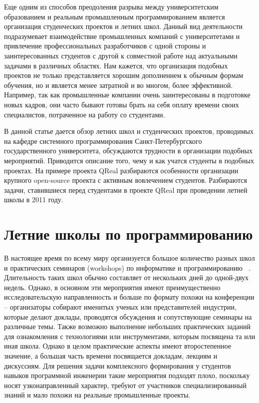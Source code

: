\documentclass[a4paper]{article}
\begin{document}
Еще одним из способов преодоления разрыва между университетским образованием и реальным промышленным программированием является организация студенческих проектов и летних школ. Данный вид деятельности подразумевает взаимодействие промышленных компаний с университетами и привлечение профессиональных разработчиков с одной стороны и заинтересованных студентов с другой к совместной работе над актуальными задачами в различных областях. Нам кажется, что организация подобных проектов не только представляется хорошим дополнением к обычным формам обучения, но и является менее затратной и во многом, более эффективной. Например, так как промышленные компании очень заинтересованы в подготовке новых кадров, они часто бывают готовы брать на себя оплату времени своих специалистов, потраченное на работу со студентами. 
 
В данной статье дается обзор летних школ и студенческих проектов, проводимых на кафедре системного программирования Санкт-Петербургского государственного университета, обсуждаются трудности в организации подобных мероприятий. Приводится описание того, чему и как учатся студенты в подобных проектах. На примере проекта QReal разбираются особенности организации крупного open-source проекта с активным вовлечением студентов. Разбираются задачи, ставившиеся перед студентами в проекте QReal при проведении летней школы в 2011 году.

\section{Летние школы по программированию}

В настоящее время по всему миру организуется большое количество разных школ и практических семинаров (workshops) по информатике и программированию ~\cite{schoolList}. Длительность таких школ обычно составляет от нескольких дней до одной-двух недель. Однако, в основном эти мероприятия имеют преимущественно исследовательскую направленность  и больше по формату похожи на конференции -- организаторы собирают именитых ученых или представителей индустрии, которые делают доклады, проводятся обсуждения и сопутствующие семинары на различные темы. Также возможно выполнение небольших практических заданий для ознакомления с технологиями или инструментами, которым посвящена та или иная школа. Однако в целом практические аспекты имеют второстепенное значение, а большая часть времени посвящается докладам, лекциям и дискуссиям. Для решения задачи комплексного формирования у студентов навыков программной инженерии такие мероприятия подходят плохо, поскольку носят узконаправленный характер, требуют от участников специализированный знаний и мало похожи на  реальные промышленные проекты.
\end{document}
